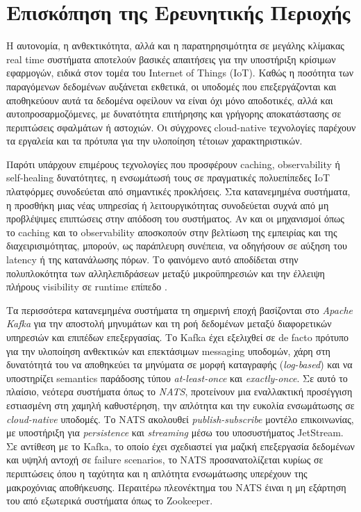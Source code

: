 \chapter{Επισκόπηση της Ερευνητικής Περιοχής}

Η αυτονομία, η ανθεκτικότητα, αλλά και η παρατηρησιμότητα σε μεγάλης κλίμακας real time συστήματα αποτελούν βασικές απαιτήσεις για την υποστήριξη κρίσιμων εφαρμογών, ειδικά στον τομέα του Internet of Things (IoT). Καθώς η ποσότητα των παραγόμενων δεδομένων αυξάνεται εκθετικά, οι υποδομές που επεξεργάζονται και αποθηκεύουν αυτά τα δεδομένα οφείλουν να είναι όχι μόνο αποδοτικές, αλλά και αυτοπροσαρμοζόμενες, με δυνατότητα επιτήρησης και γρήγορης αποκατάστασης σε περιπτώσεις σφαλμάτων ή αστοχιών. Οι σύγχρονες cloud-native τεχνολογίες παρέχουν τα εργαλεία και τα πρότυπα για την υλοποίηση τέτοιων χαρακτηριστικών.

Παρότι υπάρχουν επιμέρους τεχνολογίες που προσφέρουν caching, observability ή self-healing δυνατότητες, η ενσωμάτωσή τους σε πραγματικές πολυεπίπεδες IoT πλατφόρμες συνοδεύεται από σημαντικές προκλήσεις. Στα κατανεμημένα συστήματα, η προσθήκη μιας νέας υπηρεσίας ή λειτουργικότητας συνοδεύεται συχνά από μη προβλέψιμες επιπτώσεις στην απόδοση του συστήματος. Αν και οι μηχανισμοί όπως το caching και το observability αποσκοπούν στην βελτίωση της εμπειρίας και της διαχειρισιμότητας, μπορούν, ως παράπλευρη συνέπεια, να οδηγήσουν σε αύξηση του latency ή της κατανάλωσης πόρων. Το φαινόμενο αυτό αποδίδεται στην πολυπλοκότητα των αλληλεπιδράσεων μεταξύ μικροϋπηρεσιών και την έλλειψη πλήρους visibility σε runtime επίπεδο \cite{kleppmanndda}.

Τα περισσότερα κατανεμημένα συστήματα τη σημερινή εποχή βασίζονται στο \textit{Apache Kafka} για την αποστολή μηνυμάτων και τη ροή δεδομένων μεταξύ διαφορετικών υπηρεσιών και επιπέδων επεξεργασίας. Το Kafka έχει εξελιχθεί σε de facto πρότυπο για την υλοποίηση ανθεκτικών και επεκτάσιμων messaging υποδομών, χάρη στη δυνατότητά του να αποθηκεύει τα μηνύματα σε μορφή καταγραφής (\textit{log-based}) και να υποστηρίζει semantics παράδοσης τύπου \textit{at-least-once} και \textit{exactly-once}. Σε αυτό το πλαίσιο, νεότερα συστήματα όπως το \textit{NATS}, προτείνουν μια εναλλακτική προσέγγιση εστιασμένη στη χαμηλή καθυστέρηση, την απλότητα και την ευκολία ενσωμάτωσης σε \textit{cloud-native} υποδομές. Το NATS ακολουθεί \textit{publish-subscribe} μοντέλο επικοινωνίας, με υποστήριξη για \textit{persistence} και \textit{streaming} μέσω του υποσυστήματος JetStream. Σε αντίθεση με το Kafka, το οποίο έχει σχεδιαστεί για μαζική επεξεργασία δεδομένων και υψηλή αντοχή σε failure scenarios, το NATS προσανατολίζεται κυρίως σε περιπτώσεις όπου η ταχύτητα και η απλότητα ενσωμάτωσης υπερέχουν της μακροχόνιας αποθήκευσης. Περαιτέρω πλεονέκτημα του NATS έιναι η μη εξάρτηση του από εξωτερικά συστήματα όπως το Zookeeper.

